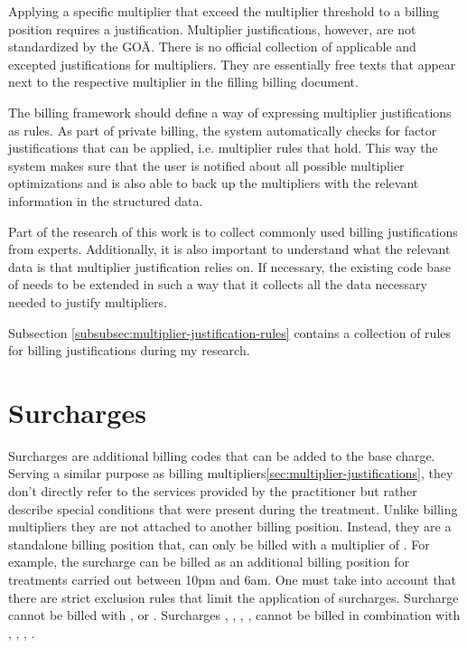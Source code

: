 Applying a specific multiplier that exceed the multiplier threshold to a billing position requires a justification.
Multiplier justifications, however, are not standardized by the GOÄ\cite[]{bruck1998kommentar}.
There is no official collection of applicable and excepted justifications for multipliers.
They are essentially free texts that appear next to the respective multiplier in the filling billing document.

The billing framework should define a way of expressing multiplier justifications as rules.
As part of private billing, the system automatically checks for factor justifications that can be applied, i.e. multiplier rules that hold.
This way the system makes sure that the user is notified about all possible multiplier optimizations and is also able to back up the multipliers with the relevant information in the structured data.

Part of the research of this work is to collect commonly used billing justifications from experts.
Additionally, it is also important to understand what the relevant data is that multiplier justification relies on.
If necessary, the existing code base of \AV needs to be extended in such a way that it collects all the data necessary needed to justify multipliers.

Subsection \ref{subsubsec:multiplier-justification-rules} contains a collection of rules for billing justifications during my research.


\section{Surcharges}\label{sec:surcharges}
Surcharges are additional billing codes that can be added to the base charge.
Serving a similar purpose as billing multipliers\ref{sec:multiplier-justifications}, they don't directly refer to the services provided by the practitioner but rather describe special conditions that were present during the treatment\cite{walter2008abrechnung}.
Unlike billing multipliers they are not attached to another billing position.
Instead, they are a standalone billing position that, can only be billed with a multiplier of .
For example, the surcharge  can be billed as an additional billing position for treatments carried out between 10pm and 6am.
One must take into account that there are strict exclusion rules that limit the application of surcharges\cite{kommentar2012zuschlage}.
Surcharge  cannot be billed with ,  or .
Surcharges , , , ,  cannot be billed in combination with , , , \cite{kommentar2012zuschlage}.

